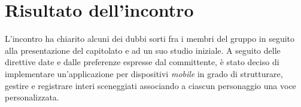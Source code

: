 \section{Risultato dell'incontro}
L'incontro ha chiarito alcuni dei dubbi sorti fra  i membri del gruppo in seguito alla presentazione del capitolato e ad un suo studio iniziale. A seguito delle direttive date e dalle preferenze espresse dal committente, è stato deciso di implementare un'applicazione per dispositivi \textit{mobile} in grado di strutturare, gestire e registrare interi sceneggiati associando a ciascun personaggio una voce personalizzata.


